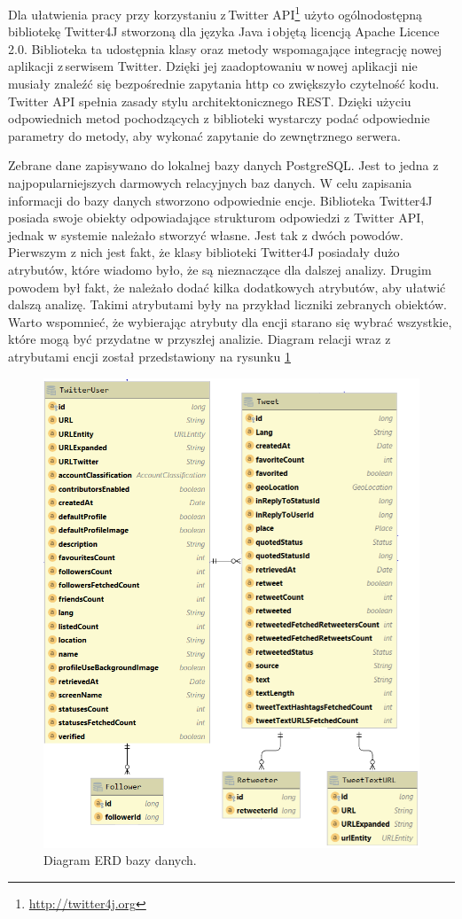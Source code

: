 Dla ułatwienia pracy przy korzystaniu z\,Twitter API\footnote{\url{http://twitter4j.org}} użyto ogólnodostępną bibliotekę Twitter4J stworzoną dla języka Java i\,objętą licencją Apache Licence 2.0. Biblioteka ta udostępnia klasy oraz metody wspomagające integrację nowej aplikacji z\,serwisem Twitter. Dzięki jej zaadoptowaniu w\,nowej aplikacji nie musiały znaleźć się bezpośrednie zapytania http co zwiększyło czytelność kodu. Twitter API spełnia zasady stylu architektonicznego REST. Dzięki użyciu odpowiednich metod pochodzących z biblioteki wystarczy podać odpowiednie parametry do metody, aby wykonać zapytanie do zewnętrznego serwera.
\par
Zebrane dane zapisywano do lokalnej bazy danych PostgreSQL. Jest to jedna z najpopularniejszych darmowych relacyjnych baz danych. W celu zapisania informacji do bazy danych stworzono odpowiednie encje. Biblioteka Twitter4J posiada swoje obiekty odpowiadające strukturom odpowiedzi z Twitter API, jednak w systemie należało stworzyć własne. Jest tak z dwóch powodów. Pierwszym z nich jest fakt, że klasy biblioteki Twitter4J posiadały dużo atrybutów, które wiadomo było, że są nieznaczące dla dalszej analizy. Drugim powodem był fakt, że należało dodać kilka dodatkowych atrybutów, aby ułatwić dalszą analizę. Takimi atrybutami były na przykład liczniki zebranych obiektów. Warto wspomnieć, że wybierając atrybuty dla encji starano się wybrać wszystkie, które mogą być przydatne w przyszłej analizie. Diagram relacji  wraz z atrybutami encji został przedstawiony na rysunku \ref{fig:diagram-db}
\begin{figure}[!h]
	\centering \includegraphics[width=0.9\linewidth]{img/diagramERD.png}
	\caption{Diagram ERD bazy danych. } \label{fig:diagram-db}
\end{figure}
